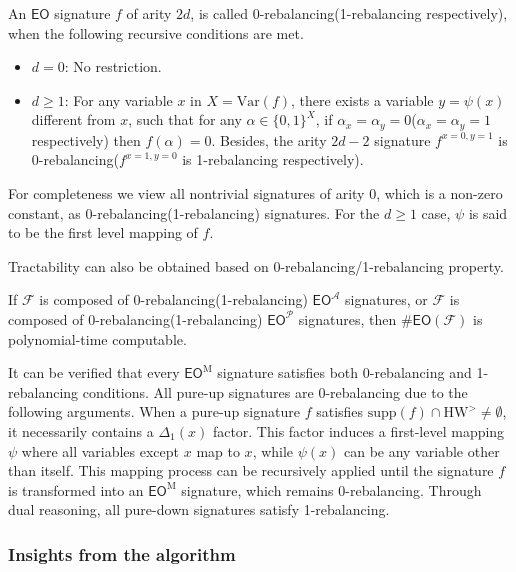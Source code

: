 \documentclass[a4paper,UKenglish,cleveref, autoref, thm-restate]{lipics-v2021}
\newcommand{\eo}[0]{\textsf{EO}}
\newcommand{\hw}[1]{\text{HW}^{#1}}
\newcommand{\su}[0]{\text{supp}}
\newcommand{\eom}[1][\text{M}]{\textsf{EO}^{#1}}
\newcommand{\ba}[1][0]{{{#1}-rebalancing}}
\begin{document}
\begin{definition}[Rebalancing]
An $\eo$ signature $f$ of arity $2d$, is called \ba[0](\ba[1] respectively), when the following  recursive conditions are met.
\begin{itemize}
    \item $d=0$: No restriction.
    \item $d\ge 1$: For any variable $x$ in $X=\text{Var}(f)$, there exists a variable $y=\psi(x)$ different from $x$, such that for any $\alpha\in\{0,1\}^X$, if $\alpha_x=\alpha_y=0$($\alpha_x=\alpha_y=1$ respectively) then $f(\alpha)=0$. Besides, the arity $2d-2$ signature $f^{x=0,y=1}$ is 0-rebalancing($f^{x=1,y=0}$ is \ba[1] respectively).
\end{itemize}
For completeness we view all nontrivial signatures of arity 0, which is a non-zero constant, as \ba[0](\ba[1]) signatures. For the $d\ge 1$ case, $\psi$ is said to be the first level mapping of $f$.
\label{def:reba}
\end{definition}

Tractability can also be obtained based on \ba[0]/\ba[1] property.

\begin{theorem}
If $\mathcal{F}$ is composed of \ba[0](\ba[1]) $\eom[\mathscr{A}]$ signatures, or $\mathcal{F}$ is composed of \ba[0](\ba[1]) $\eom[\mathscr{P}]$ signatures, then $\#\eo(\mathcal{F})$ is polynomial-time computable.
\label{thm:rebaalg}
\end{theorem}






\begin{remark}
It can be verified that every $\eom$ signature satisfies both \ba[0] and \ba[1] conditions. All pure-up signatures are \ba[0] due to the following arguments. When a pure-up signature $f$ satisfies $\su(f)\cap\hw{>}\neq\emptyset$, it necessarily contains a $\Delta_1(x)$ factor. This factor induces a first-level mapping $\psi$ where all variables except $x$ map to $x$, while $\psi(x)$ can be any variable other than itself. This mapping process can be recursively applied until the signature $f$ is transformed into an $\eom$ signature, which remains \ba[0]. Through dual reasoning, all pure-down signatures satisfy \ba[1].
\end{remark}
\subsubsection{Insights from the algorithm}
\end{document}
